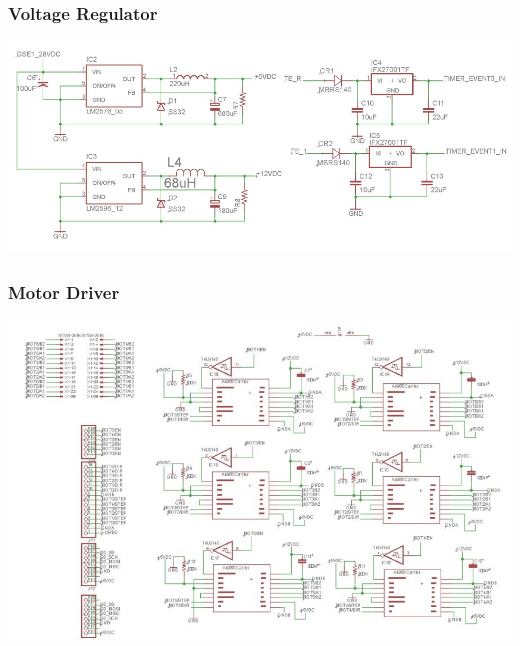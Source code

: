 \subsubsection{Voltage Regulator}
\includegraphics[width=\textwidth]{./images/EESchems/voltageRegulator}

\subsubsection{Motor Driver}
\includegraphics[width=\textwidth]{./images/EESchems/motorDriver}

